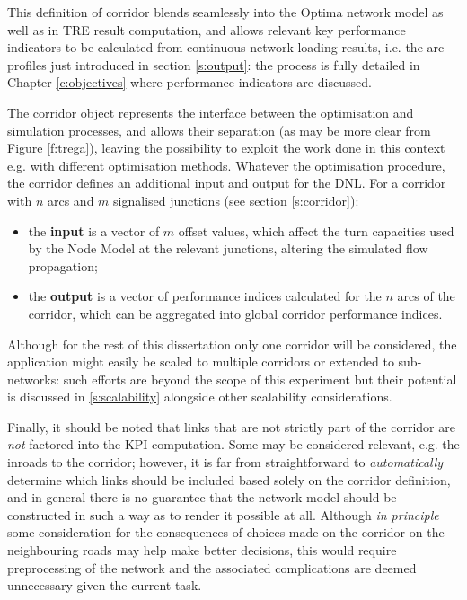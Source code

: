 This definition of corridor blends seamlessly into the Optima network model as well as in TRE result computation, and allows relevant key performance indicators to be calculated from continuous network loading results, i.e. the arc profiles just introduced in section \ref{s:output}: the process is fully detailed in Chapter \ref{c:objectives} where performance indicators are discussed.

The corridor object represents the interface between the optimisation and simulation processes, and allows their separation (as may be more clear from Figure \ref{f:trega}), leaving the possibility to exploit the work done in this context e.g. with different optimisation methods. Whatever the optimisation procedure, the corridor defines an additional input and output for the DNL. For a corridor with $n$ arcs and $m$ signalised junctions (see section \ref{s:corridor}):
\begin{itemize}
\item the \textbf{input} is a vector of $m$ offset values, which affect the turn capacities used by the Node Model at the relevant junctions, altering the simulated flow propagation;
\item the \textbf{output} is a vector of performance indices calculated for the $n$ arcs of the corridor, which can be aggregated into global corridor performance indices.
\end{itemize}

Although for the rest of this dissertation only one corridor will be considered, the application might easily be scaled to multiple corridors or extended to sub-networks: such efforts are beyond the scope of this experiment but their potential is discussed in \ref{s:scalability} alongside other scalability considerations.

Finally, it should be noted that links that are not strictly part of the corridor are \emph{not} factored into the KPI computation. Some may be considered relevant, e.g. the inroads to the corridor; however, it is far from straightforward to \emph{automatically} determine which links should be included based solely on the corridor definition, and in general there is no guarantee that the network model should be constructed in such a way as to render it possible at all. Although \emph{in principle} some consideration for the consequences of choices made on the corridor on the neighbouring roads may help make better decisions, this would require preprocessing of the network and the associated complications are deemed unnecessary given the current task.

